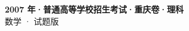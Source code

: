\documentclass[zihao=-4, a4paper]{ctexart}
\begin{document}
\begin{center}
  {\Large\bfseries 2007 年·普通高等学校招生考试·重庆卷·理科}\\[4pt]
  {\large 数学 · 试题版}
\end{center}
\medskip
{}

\end{document}

